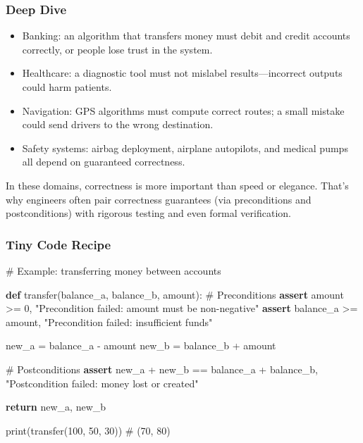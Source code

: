 \documentclass[
  letterpaper,
  DIV=11,
  numbers=noendperiod]{scrreprt}
\newenvironment{Shaded}{\begin{snugshade}}{\end{snugshade}}
\newcommand{\BuiltInTok}[1]{\textcolor[rgb]{0.00,0.23,0.31}{#1}}
\newcommand{\CommentTok}[1]{\textcolor[rgb]{0.37,0.37,0.37}{#1}}
\newcommand{\ControlFlowTok}[1]{\textcolor[rgb]{0.00,0.23,0.31}{\textbf{#1}}}
\newcommand{\DecValTok}[1]{\textcolor[rgb]{0.68,0.00,0.00}{#1}}
\newcommand{\KeywordTok}[1]{\textcolor[rgb]{0.00,0.23,0.31}{\textbf{#1}}}
\newcommand{\NormalTok}[1]{\textcolor[rgb]{0.00,0.23,0.31}{#1}}
\newcommand{\OperatorTok}[1]{\textcolor[rgb]{0.37,0.37,0.37}{#1}}
\newcommand{\StringTok}[1]{\textcolor[rgb]{0.13,0.47,0.30}{#1}}
\providecommand{\tightlist}{%
  \setlength{\itemsep}{0pt}\setlength{\parskip}{0pt}}
\begin{document}
\subsubsection{Deep Dive}\label{deep-dive-38}

\begin{itemize}
\tightlist
\item
  Banking: an algorithm that transfers money must debit and credit
  accounts correctly, or people lose trust in the system.
\item
  Healthcare: a diagnostic tool must not mislabel results---incorrect
  outputs could harm patients.
\item
  Navigation: GPS algorithms must compute correct routes; a small
  mistake could send drivers to the wrong destination.
\item
  Safety systems: airbag deployment, airplane autopilots, and medical
  pumps all depend on guaranteed correctness.
\end{itemize}

In these domains, correctness is more important than speed or elegance.
That's why engineers often pair correctness guarantees (via
preconditions and postconditions) with rigorous testing and even formal
verification.

\subsubsection{Tiny Code Recipe}\label{tiny-code-recipe-66}

\begin{Shaded}
\begin{Highlighting}[]
\CommentTok{\# Example: transferring money between accounts}

\KeywordTok{def}\NormalTok{ transfer(balance\_a, balance\_b, amount):}
    \CommentTok{\# Preconditions}
    \ControlFlowTok{assert}\NormalTok{ amount }\OperatorTok{\textgreater{}=} \DecValTok{0}\NormalTok{, }\StringTok{"Precondition failed: amount must be non{-}negative"}
    \ControlFlowTok{assert}\NormalTok{ balance\_a }\OperatorTok{\textgreater{}=}\NormalTok{ amount, }\StringTok{"Precondition failed: insufficient funds"}
    
\NormalTok{    new\_a }\OperatorTok{=}\NormalTok{ balance\_a }\OperatorTok{{-}}\NormalTok{ amount}
\NormalTok{    new\_b }\OperatorTok{=}\NormalTok{ balance\_b }\OperatorTok{+}\NormalTok{ amount}
    
    \CommentTok{\# Postconditions}
    \ControlFlowTok{assert}\NormalTok{ new\_a }\OperatorTok{+}\NormalTok{ new\_b }\OperatorTok{==}\NormalTok{ balance\_a }\OperatorTok{+}\NormalTok{ balance\_b, }\StringTok{"Postcondition failed: money lost or created"}
    
    \ControlFlowTok{return}\NormalTok{ new\_a, new\_b}

\BuiltInTok{print}\NormalTok{(transfer(}\DecValTok{100}\NormalTok{, }\DecValTok{50}\NormalTok{, }\DecValTok{30}\NormalTok{))  }\CommentTok{\# (70, 80)}
\end{Highlighting}
\end{Shaded}
\end{document}
